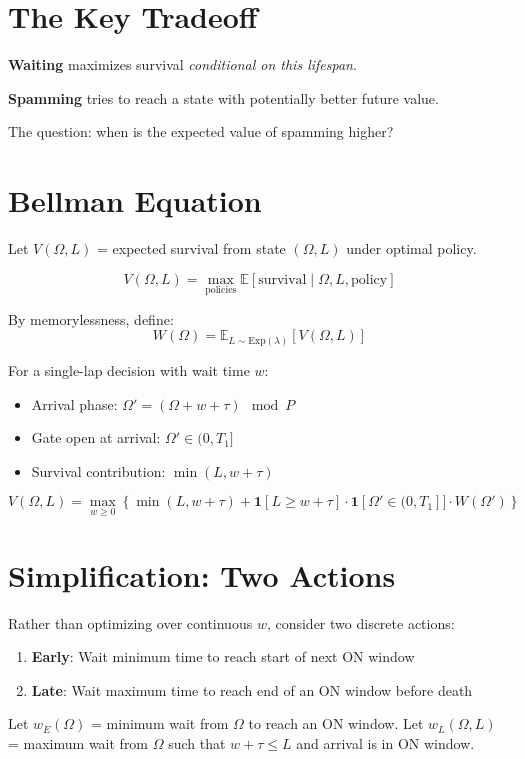 \documentclass{article}
\newcommand{\E}{\mathbb{E}}
\newcommand{\ind}{\mathbf{1}}
\begin{document}
\section{The Key Tradeoff}

\textbf{Waiting} maximizes survival \emph{conditional on this lifespan}.

\textbf{Spamming} tries to reach a state with potentially better future value.

The question: when is the expected value of spamming higher?

\section{Bellman Equation}

Let $V(\Omega, L)$ = expected survival from state $(\Omega, L)$ under optimal policy.

\[
V(\Omega, L) = \max_{\text{policies}} \E[\text{survival} \mid \Omega, L, \text{policy}]
\]

By memorylessness, define:
\[
W(\Omega) = \E_{L \sim \text{Exp}(\lambda)}[V(\Omega, L)]
\]

For a single-lap decision with wait time $w$:
\begin{itemize}
    \item Arrival phase: $\Omega' = (\Omega + w + \tau) \mod P$
    \item Gate open at arrival: $\Omega' \in (0, T_1]$
    \item Survival contribution: $\min(L, w + \tau)$
\end{itemize}

\[
V(\Omega, L) = \max_{w \geq 0} \left\{
\min(L, w + \tau) + \ind[L \geq w + \tau] \cdot \ind[\Omega' \in (0, T_1]] \cdot W(\Omega')
\right\}
\]

\section{Simplification: Two Actions}

Rather than optimizing over continuous $w$, consider two discrete actions:
\begin{enumerate}
    \item \textbf{Early}: Wait minimum time to reach start of next ON window
    \item \textbf{Late}: Wait maximum time to reach end of an ON window before death
\end{enumerate}

Let $w_E(\Omega)$ = minimum wait from $\Omega$ to reach an ON window.
Let $w_L(\Omega, L)$ = maximum wait from $\Omega$ such that $w + \tau \leq L$ and arrival is in ON window.
\end{document}
